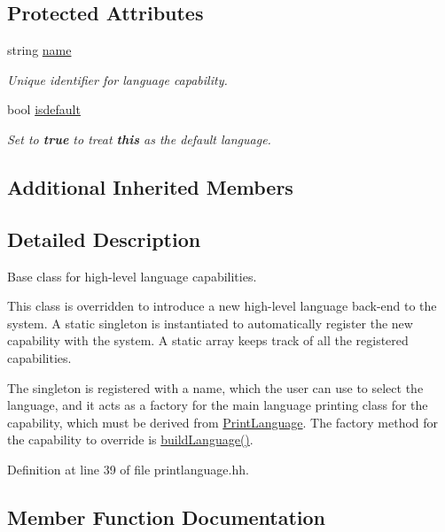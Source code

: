 \subsection*{Protected Attributes}
\begin{DoxyCompactItemize}
\item 
string \mbox{\hyperlink{class_print_language_capability_ac286f0481d6c9ebfcf2cd497cc786e8b}{name}}
\begin{DoxyCompactList}\small\item\em Unique identifier for language capability. \end{DoxyCompactList}\item 
bool \mbox{\hyperlink{class_print_language_capability_ac59b85a0cca4d610739ae88a614361bc}{isdefault}}
\begin{DoxyCompactList}\small\item\em Set to {\bfseries{true}} to treat {\bfseries{this}} as the default language. \end{DoxyCompactList}\end{DoxyCompactItemize}
\subsection*{Additional Inherited Members}


\subsection{Detailed Description}
Base class for high-\/level language capabilities. 

This class is overridden to introduce a new high-\/level language back-\/end to the system. A static singleton is instantiated to automatically register the new capability with the system. A static array keeps track of all the registered capabilities.

The singleton is registered with a name, which the user can use to select the language, and it acts as a factory for the main language printing class for the capability, which must be derived from \mbox{\hyperlink{class_print_language}{Print\+Language}}. The factory method for the capability to override is \mbox{\hyperlink{class_print_language_capability_a50e2abb3f0b4cf3ab67556f77eacc51e}{build\+Language()}}. 

Definition at line 39 of file printlanguage.\+hh.



\subsection{Member Function Documentation}
\mbox{\label{class_print_language_capability_a50e2abb3f0b4cf3ab67556f77eacc51e}} 
